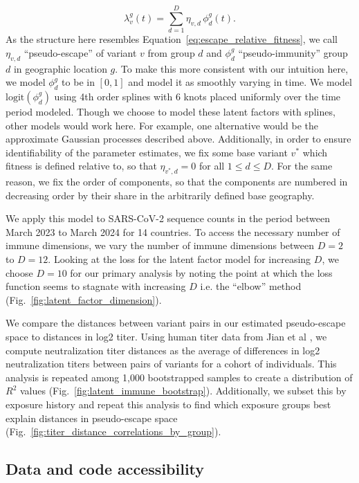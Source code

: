 \documentclass[11pt,oneside,letterpaper]{article}
\newcommand{\varEscape}{\eta}
\begin{document}
\begin{equation}
    \lambda_{v}^{g}(t) = \sum_{d=1}^{D} \varEscape_{v,d} \, \phi_{d}^{g}(t).
\end{equation}
As the structure here resembles Equation~\ref{eq:escape_relative_fitness}, we call $\varEscape_{v,d}$ ``pseudo-escape'' of variant $v$ from group $d$ and $\phi_{d}^{g}$ ``pseudo-immunity'' group $d$ in geographic location $g$.
To make this more consistent with our intuition here, we model $\phi_{d}^{g}$ to be in $[0,1]$ and model it as smoothly varying in time.
We model $\text{logit}(\phi_{d}^{g})$ using 4th order splines with 6 knots placed uniformly over the time period modeled.
Though we choose to model these latent factors with splines, other models would work here.
For example, one alternative would be the approximate Gaussian processes described above.
Additionally, in order to ensure identifiability of the parameter estimates, we fix some base variant $v^*$ which fitness is defined relative to, so that $\varEscape_{v^*, d} = 0$ for all $1\leq d\leq D$.
For the same reason, we fix the order of components, so that the components are numbered in decreasing order by their share in the arbitrarily defined base geography.

We apply this model to SARS-CoV-2 sequence counts in the period between March 2023 to March 2024 for 14 countries.
To access the necessary number of immune dimensions, we vary the number of immune dimensions between $D=2$ to $D=12$.
Looking at the loss for the latent factor model for increasing $D$, we choose $D=10$ for our primary analysis by noting the point at which the loss function seems to stagnate with increasing $D$ i.e. the ``elbow'' method (Fig.~\ref{fig:latent_factor_dimension}).

We compare the distances between variant pairs in our estimated pseudo-escape space to distances in log2 titer.
Using human titer data from Jian et al \cite{Jian2023}, we compute neutralization titer distances as the average of differences in log2 neutralization titers between pairs of variants for a cohort of individuals.
This analysis is repeated among 1,000 bootstrapped samples to create a distribution of $R^2$ values (Fig.~\ref{fig:latent_immune_bootstrap}).
Additionally, we subset this by exposure history and repeat this analysis to find which exposure groups best explain distances in pseudo-escape space (Fig.~\ref{fig:titer_distance_correlations_by_group}).

\subsection*{Data and code accessibility}
\end{document}
